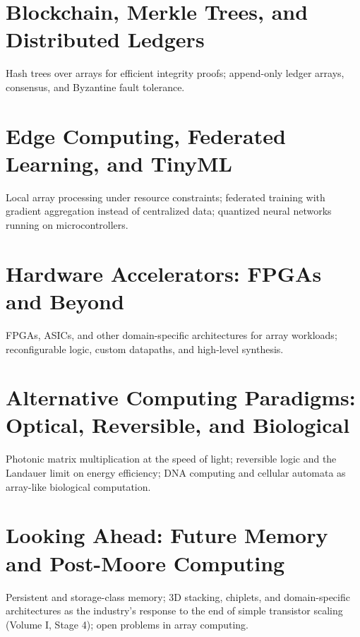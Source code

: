 \chapter{Blockchain, Merkle Trees, and Distributed Ledgers}
Hash trees over arrays for efficient integrity proofs; append-only ledger arrays, consensus, and Byzantine fault tolerance.

\chapter{Edge Computing, Federated Learning, and TinyML}
Local array processing under resource constraints; federated training with gradient aggregation instead of centralized data; quantized neural networks running on microcontrollers.

\chapter{Hardware Accelerators: FPGAs and Beyond}
FPGAs, ASICs, and other domain-specific architectures for array workloads; reconfigurable logic, custom datapaths, and high-level synthesis.

\chapter{Alternative Computing Paradigms: Optical, Reversible, and Biological}
Photonic matrix multiplication at the speed of light; reversible logic and the Landauer limit on energy efficiency; DNA computing and cellular automata as array-like biological computation.

\chapter{Looking Ahead: Future Memory and Post-Moore Computing}
Persistent and storage-class memory; 3D stacking, chiplets, and domain-specific architectures as the industry's response to the end of simple transistor scaling (Volume I, Stage 4); open problems in array computing.

